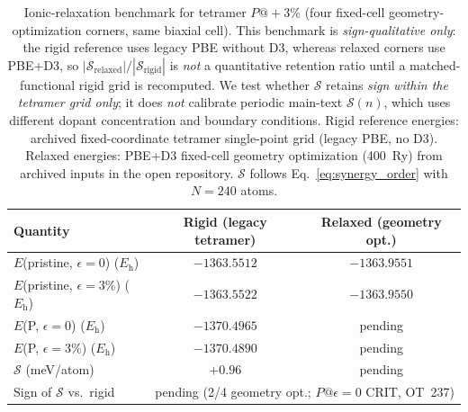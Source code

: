 \begin{table}[t]
\caption{\label{tab:S3}Ionic-relaxation benchmark for tetramer $P@+3$\% (four fixed-cell geometry-optimization corners, same biaxial cell).
This benchmark is \emph{sign-qualitative only}: the rigid reference uses legacy PBE without D3, whereas relaxed corners use PBE+D3, so $|\mathcal{S}_{\mathrm{relaxed}}|/|\mathcal{S}_{\mathrm{rigid}}|$ is \emph{not} a quantitative retention ratio until a matched-functional rigid grid is recomputed. We test whether $\mathcal{S}$ retains \emph{sign} \emph{within the tetramer grid only}; it does \emph{not} calibrate periodic main-text $\mathcal{S}(n)$, which uses different dopant concentration and boundary conditions.
Rigid reference energies: archived fixed-coordinate tetramer single-point grid (legacy PBE, no D3). Relaxed energies: PBE+D3 fixed-cell geometry optimization (400~Ry) from archived inputs in the open repository.
$\mathcal{S}$ follows Eq.~\eqref{eq:synergy_order} with $N{=}240$ atoms.}
\begin{ruledtabular}
\begin{tabular}{lcc}
Quantity & Rigid (legacy tetramer) & Relaxed (geometry opt.) \\
\hline
$E$(pristine, $\epsilon{=}0$) ($E_{\mathrm{h}}$) & $-1363.5512$ & $-1363.9551$ \\
$E$(pristine, $\epsilon{=}3$\%) ($E_{\mathrm{h}}$) & $-1363.5522$ & $-1363.9550$ \\
$E$(P, $\epsilon{=}0$) ($E_{\mathrm{h}}$) & $-1370.4965$ & pending \\
$E$(P, $\epsilon{=}3$\%) ($E_{\mathrm{h}}$) & $-1370.4890$ & pending \\
$\mathcal{S}$ (meV/atom) & $+0.96$ & pending \\
Sign of $\mathcal{S}$ vs.\ rigid & \multicolumn{2}{c}{pending (2/4 geometry opt.; $P@\epsilon{=}0$ CRIT, OT~237)} \\
\end{tabular}
\end{ruledtabular}
\end{table}
